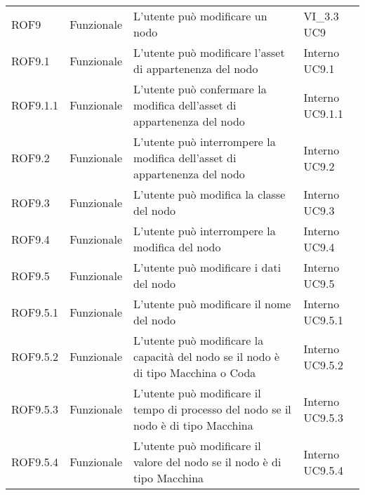\begin{longtable}{p{2cm}!{\VRule[1pt]}p{2cm}!{\VRule[1pt]}p{5cm}!{\VRule[1pt]}p{1.5cm}}
\\
ROF9&Funzionale\newline  & L'utente può modificare un nodo & VI_3.3 \newline UC9
\\
ROF9.1&Funzionale\newline  & L'utente può modificare l'asset di appartenenza del nodo & Interno \newline UC9.1
\\
ROF9.1.1&Funzionale\newline  & L'utente può confermare la modifica dell'asset di appartenenza del nodo & Interno \newline UC9.1.1
\\
ROF9.2&Funzionale\newline  & L'utente può interrompere la modifica dell'asset di appartenenza del nodo & Interno \newline UC9.2
\\
ROF9.3&Funzionale\newline  & L'utente può modifica la classe del nodo & Interno \newline UC9.3
\\
ROF9.4&Funzionale\newline  & L'utente può interrompere la modifica del nodo & Interno \newline UC9.4
\\
ROF9.5&Funzionale\newline  & L'utente può modificare i dati del nodo & Interno \newline UC9.5
\\
ROF9.5.1&Funzionale\newline  & L'utente può modificare il nome del nodo & Interno \newline UC9.5.1
\\
ROF9.5.2&Funzionale\newline  & L'utente può modificare la capacità del nodo se il nodo è di tipo Macchina o Coda & Interno \newline UC9.5.2
\\
ROF9.5.3&Funzionale\newline  & L'utente può modificare il tempo di processo del nodo se il nodo è di tipo Macchina & Interno \newline UC9.5.3
\\
ROF9.5.4&Funzionale\newline  & L'utente può modificare il valore del nodo se il nodo è di tipo Macchina & Interno \newline UC9.5.4

\end{longtable}
